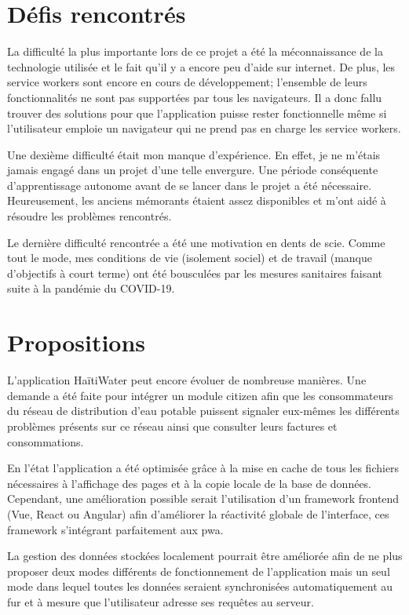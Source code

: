 \documentclass{EPL-master-thesis-covers-FR}
\begin{document}
		\section{Défis rencontrés}
			La difficulté la plus importante lors de ce projet a été la méconnaissance de la technologie utilisée et le fait qu'il y a encore peu d'aide sur internet. De plus, les service workers sont encore en cours de développement; l'ensemble de leurs fonctionnalités ne sont pas supportées par tous les navigateurs. Il a donc fallu trouver des solutions pour que l'application puisse rester fonctionnelle même si l'utilisateur emploie un navigateur qui ne prend pas en charge les service workers. 
			
			Une dexième difficulté était mon manque d'expérience. En effet, je ne m'étais jamais engagé dans un projet d'une telle envergure. Une période conséquente d'apprentissage autonome avant de se lancer dans le projet a été nécessaire. Heureusement, les anciens mémorants étaient assez disponibles et m'ont aidé à résoudre les problèmes rencontrés.
			
			Le dernière difficulté rencontrée a été une motivation en dents de scie. Comme tout le mode, mes conditions de vie (isolement sociel) et de travail (manque d'objectifs à court terme) ont été bousculées par les mesures sanitaires faisant suite à la pandémie du COVID-19. 
			

		\section{Propositions}
		\label{sec:proposition}
			L'application HaïtiWater peut encore évoluer de nombreuse manières. Une demande a été faite pour intégrer un module \Gls{citizen} afin que les consommateurs du réseau de distribution d'eau potable puissent signaler eux-mêmes les différents problèmes présents sur ce réseau ainsi que consulter leurs factures et consommations.
			
			En l'état l'application a été optimisée grâce à la mise en cache de tous les fichiers nécessaires à l'affichage des pages et à la copie locale de la base de données. Cependant, une amélioration possible serait l'utilisation d'un \gls{framework} frontend (Vue, React ou Angular) afin d'améliorer la réactivité globale de l'interface, ces \gls{framework} s'intégrant parfaitement aux \gls{pwa}.
			
			La gestion des données stockées localement pourrait être améliorée afin de ne plus proposer deux modes différents de fonctionnement de l'application mais un seul mode dans lequel toutes les données seraient synchronisées automatiquement au fur et à mesure que l'utilisateur adresse ses requêtes au serveur.
			
\end{document}
